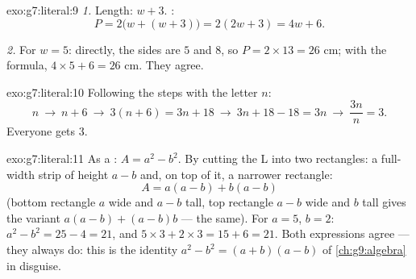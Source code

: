 \begin{solution}{exo:g7:literal:9}
\emph{1.} Length: $w + 3$. :
\[
P = 2\bigl(w + (w + 3)\bigr) = 2(2w + 3) = 4w + 6 .
\]

\emph{2.} For $w = 5$: directly, the sides are $5$ and $8$, so
$P = 2 \times 13 = 26$ cm; with the formula, $4 \times 5 + 6 = 26$ cm.
They agree.
\end{solution}

\begin{solution}{exo:g7:literal:10}
Following the steps with the letter $n$:
\[
n \ \to\ n + 6 \ \to\ 3(n + 6) = 3n + 18 \ \to\ 3n + 18 - 18 = 3n
\ \to\ \frac{3n}{n} = 3 .
\]
Everyone gets $3$.
\end{solution}

\begin{solution}{exo:g7:literal:11}
As a : $A = a^2 - b^2$. By cutting the L into two
rectangles: a full-width strip of height $a - b$ and, on top of it, a
narrower rectangle:
\[
A = a(a - b) + b(a - b)
\]
(bottom rectangle $a$ wide and $a - b$ tall, top rectangle $a - b$
wide and $b$ tall gives the variant $a(a-b) + (a-b)b$ --- the same).
For $a = 5$, $b = 2$: $a^2 - b^2 = 25 - 4 = 21$, and
$5 \times 3 + 2 \times 3 = 15 + 6 = 21$. Both expressions agree ---
they always do: this is the identity $a^2 - b^2 = (a + b)(a - b)$ of
\cref{ch:g9:algebra} in disguise.
\end{solution}

